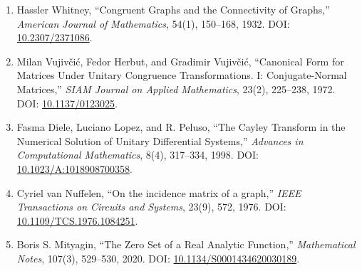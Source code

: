 \documentclass[
  a4paper,
]{article}
\providecommand{\tightlist}{%
  \setlength{\itemsep}{0pt}\setlength{\parskip}{0pt}}
\begin{document}
\begin{enumerate}
\def\labelenumi{\arabic{enumi}.}
\setcounter{enumi}{4}
\tightlist
\item
  Hassler Whitney, ``Congruent Graphs and the Connectivity of Graphs,''
  \emph{American Journal of Mathematics}, 54(1), 150--168, 1932. DOI:
  \href{https://doi.org/10.2307/2371086}{10.2307/2371086}.
\item
  Milan Vujivčić, Fedor Herbut, and Gradimir Vujivčić, ``Canonical Form
  for Matrices Under Unitary Congruence Transformations. I:
  Conjugate-Normal Matrices,'' \emph{SIAM Journal on Applied
  Mathematics}, 23(2), 225--238, 1972. DOI:
  \href{https://doi.org/10.1137/0123025}{10.1137/0123025}.
\item
  Fasma Diele, Luciano Lopez, and R. Peluso, ``The Cayley Transform in
  the Numerical Solution of Unitary Differential Systems,''
  \emph{Advances in Computational Mathematics}, 8(4), 317--334, 1998.
  DOI:
  \href{https://doi.org/10.1023/A:1018908700358}{10.1023/A:1018908700358}.
\item
  Cyriel van Nuffelen, ``On the incidence matrix of a graph,''
  \emph{IEEE Transactions on Circuits and Systems}, 23(9), 572, 1976.
  DOI:
  \href{https://doi.org/10.1109/TCS.1976.1084251}{10.1109/TCS.1976.1084251}.
\item
  Boris S. Mityagin, ``The Zero Set of a Real Analytic Function,''
  \emph{Mathematical Notes}, 107(3), 529--530, 2020. DOI:
  \href{https://doi.org/10.1134/S0001434620030189}{10.1134/S0001434620030189}.
\end{enumerate}
\end{document}
